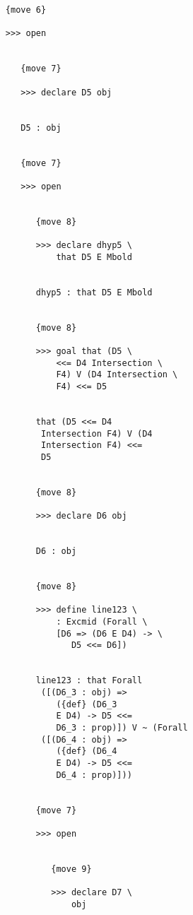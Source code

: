 \documentclass[12pt]{article}
\begin{document}
\begin{verbatim}
                  {move 6}

                  >>> open


                     {move 7}

                     >>> declare D5 obj


                     D5 : obj


                     {move 7}

                     >>> open


                        {move 8}

                        >>> declare dhyp5 \
                            that D5 E Mbold


                        dhyp5 : that D5 E Mbold


                        {move 8}

                        >>> goal that (D5 \
                            <<= D4 Intersection \
                            F4) V (D4 Intersection \
                            F4) <<= D5


                        that (D5 <<= D4 
                         Intersection F4) V (D4 
                         Intersection F4) <<= 
                         D5


                        {move 8}

                        >>> declare D6 obj


                        D6 : obj


                        {move 8}

                        >>> define line123 \
                            : Excmid (Forall \
                            [D6 => (D6 E D4) -> \
                               D5 <<= D6])


                        line123 : that Forall 
                         ([(D6_3 : obj) => 
                            ({def} (D6_3 
                            E D4) -> D5 <<= 
                            D6_3 : prop)]) V ~ (Forall 
                         ([(D6_4 : obj) => 
                            ({def} (D6_4 
                            E D4) -> D5 <<= 
                            D6_4 : prop)]))


                        {move 7}

                        >>> open


                           {move 9}

                           >>> declare D7 \
                               obj



\end{verbatim}
\end{document}
